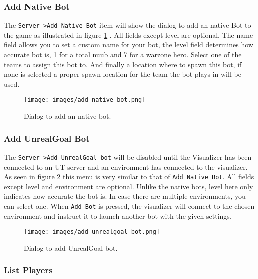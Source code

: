 \documentclass[11pt,a4paper]{article}
\begin{document}
\subsubsection*{Add Native Bot}


The \texttt{Server->Add Native Bot} item will show the dialog to add an native Bot to the game as illustrated in figure \ref{fig:add_native_bot} . All fields except level are optional. The name field allows you to set a custom name for your bot, the level field determines how accurate bot is, 1 for a total nuub and 7 for a warzone hero. Select one of the teams to assign this bot to. And finally a location where to spawn this bot, if none is selected a proper spawn location for the team the bot plays in will be used.

\begin{figure}[h!]
\centering
\texttt{[image: images/add\_native\_bot.png]}
\caption{Dialog to add an native bot.}\label{fig:add_native_bot}
\end{figure}


\subsubsection*{Add UnrealGoal Bot}

The \texttt{Server->Add UnrealGoal bot} will be disabled until the Visualizer has been connected to an UT server and an environment has connected to the visualizer. As seen in figure \ref{fig:add_unrealgoal_bot} this menu is very similar to that of \texttt{Add Native Bot}. All fields except level and environment are optional. Unlike the native bots, level here only indicates how accurate the bot is. In case there are multiple environments, you can select one. When \texttt{Add Bot} is pressed, the visualizer will connect to the chosen environment and instruct it to launch another bot with the given settings.

\begin{figure}[h!]
\centering
\texttt{[image: images/add\_unrealgoal\_bot.png]}
\caption{Dialog to add UnrealGoal bot.}\label{fig:add_unrealgoal_bot}
\end{figure}

\subsubsection*{List Players}
\end{document}

